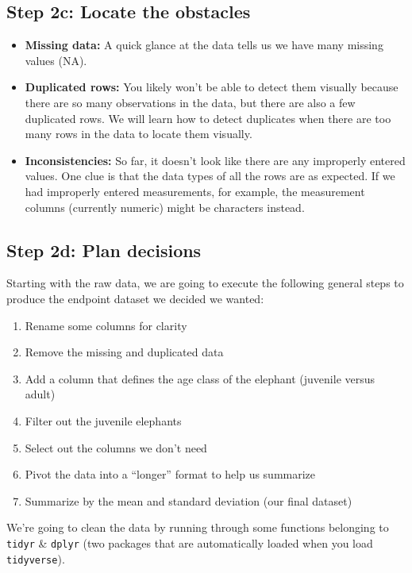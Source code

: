 \documentclass[
]{article}
\providecommand{\tightlist}{%
  \setlength{\itemsep}{0pt}\setlength{\parskip}{0pt}}
\begin{document}
\subsection{Step 2c: Locate the
obstacles}\label{step-2c-locate-the-obstacles}

\begin{itemize}
\tightlist
\item
  \textbf{Missing data:} A quick glance at the data tells us we have
  many missing values (NA).
\item
  \textbf{Duplicated rows:} You likely won't be able to detect them
  visually because there are so many observations in the data, but there
  are also a few duplicated rows. We will learn how to detect duplicates
  when there are too many rows in the data to locate them visually.
\item
  \textbf{Inconsistencies:} So far, it doesn't look like there are any
  improperly entered values. One clue is that the data types of all the
  rows are as expected. If we had improperly entered measurements, for
  example, the measurement columns (currently numeric) might be
  characters instead.
\end{itemize}

\subsection{Step 2d: Plan decisions}\label{step-2d-plan-decisions}

Starting with the raw data, we are going to execute the following
general steps to produce the endpoint dataset we decided we wanted:

\begin{enumerate}
\def\labelenumi{\arabic{enumi}.}
\tightlist
\item
  Rename some columns for clarity
\item
  Remove the missing and duplicated data
\item
  Add a column that defines the age class of the elephant (juvenile
  versus adult)
\item
  Filter out the juvenile elephants
\item
  Select out the columns we don't need
\item
  Pivot the data into a ``longer'' format to help us summarize
\item
  Summarize by the mean and standard deviation (our final dataset)
\end{enumerate}

We're going to clean the data by running through some functions
belonging to \texttt{tidyr} \& \texttt{dplyr} (two packages that are
automatically loaded when you load \texttt{tidyverse}).
\end{document}
